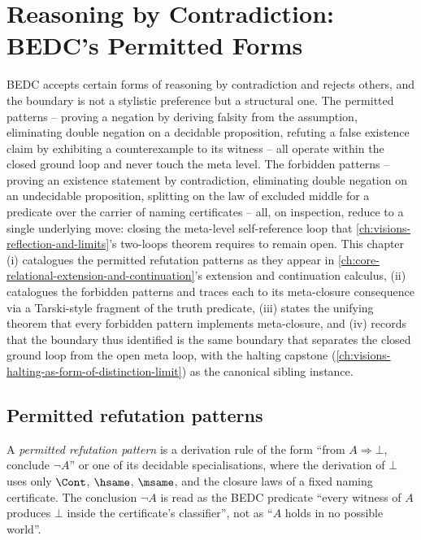 \chapter{Reasoning by Contradiction: BEDC's Permitted Forms}
\label{ch:visions-reasoning-by-contradiction-boundary}

BEDC accepts certain forms of reasoning by contradiction and rejects others, and the boundary is not a stylistic preference but a structural one. The permitted patterns -- proving a negation by deriving falsity from the assumption, eliminating double negation on a decidable proposition, refuting a false existence claim by exhibiting a counterexample to its witness -- all operate within the closed ground loop and never touch the meta level. The forbidden patterns -- proving an existence statement by contradiction, eliminating double negation on an undecidable proposition, splitting on the law of excluded middle for a predicate over the carrier of naming certificates -- all, on inspection, reduce to a single underlying move: closing the meta-level self-reference loop that \autoref{ch:visions-reflection-and-limits}'s two-loops theorem requires to remain open. This chapter (i) catalogues the permitted refutation patterns as they appear in \autoref{ch:core-relational-extension-and-continuation}'s extension and continuation calculus, (ii) catalogues the forbidden patterns and traces each to its meta-closure consequence via a Tarski-style fragment of the truth predicate, (iii) states the unifying theorem that every forbidden pattern implements meta-closure, and (iv) records that the boundary thus identified is the same boundary that separates the closed ground loop from the open meta loop, with the halting capstone (\autoref{ch:visions-halting-as-form-of-distinction-limit}) as the canonical sibling instance.

\section{Permitted refutation patterns}
\label{sec:reasoning-by-contradiction-permitted}

\begin{definition}
\label{def:reasoning-permitted-pattern}
A \emph{permitted refutation pattern} is a derivation rule of the form ``from $A \Rightarrow \bot$, conclude $\neg A$'' or one of its decidable specialisations, where the derivation of $\bot$ uses only $\Cont$, $\hsame$, $\msame$, and the closure laws of a fixed naming certificate. The conclusion $\neg A$ is read as the BEDC predicate ``every witness of $A$ produces $\bot$ inside the certificate's classifier'', not as ``$A$ holds in no possible world''.
\end{definition}

